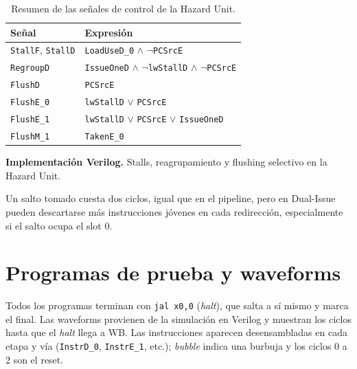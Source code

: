 \documentclass[12pt,a4paper]{article}
\begin{document}
\begin{table}[H]
\centering
\small
\begin{tabular}{ll}
\toprule
\textbf{Señal} & \textbf{Expresión} \\
\midrule
\texttt{StallF}, \texttt{StallD} & \texttt{LoadUseD\_0} $\land$ $\lnot$\texttt{PCSrcE} \\
\texttt{RegroupD} & \texttt{IssueOneD} $\land$ $\lnot$\texttt{lwStallD} $\land$ $\lnot$\texttt{PCSrcE} \\
\texttt{FlushD} & \texttt{PCSrcE} \\
\texttt{FlushE\_0} & \texttt{lwStallD} $\lor$ \texttt{PCSrcE} \\
\texttt{FlushE\_1} & \texttt{lwStallD} $\lor$ \texttt{PCSrcE} $\lor$ \texttt{IssueOneD} \\
\texttt{FlushM\_1} & \texttt{TakenE\_0} \\
\bottomrule
\end{tabular}
\caption{Resumen de las señales de control de la Hazard Unit.}
\label{tab:hazard}
\end{table}


\begin{samepage}
\noindent\textbf{Implementación Verilog.} Stalls, reagrupamiento y flushing selectivo en la Hazard Unit.
\end{samepage}


\noindent Un salto tomado cuesta dos ciclos, igual que en el pipeline, pero en Dual-Issue pueden descartarse más instrucciones jóvenes en cada redirección, especialmente si el salto ocupa el slot 0.

\FloatBarrier
\section{Programas de prueba y waveforms}
\label{sec:waves}

Todos los programas terminan con \texttt{jal x0,0} (\textit{halt}), que salta a sí mismo y marca el final. Las waveforms provienen de la simulación en Verilog y muestran los ciclos hasta que el \textit{halt} llega a WB. Las instrucciones aparecen desensambladas en cada etapa y vía (\texttt{InstrD\_0}, \texttt{InstrE\_1}, etc.); \textit{bubble} indica una burbuja y los ciclos 0 a 2 son el reset.
\end{document}
